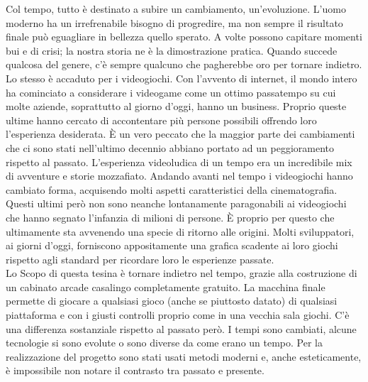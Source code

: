 
\begin{thesisabstract}[english]
Col tempo, tutto è destinato a subire un cambiamento, un’evoluzione. L’uomo moderno ha un irrefrenabile bisogno di progredire, ma non sempre il risultato finale può eguagliare in bellezza quello sperato. A volte possono capitare momenti bui e di crisi; la nostra storia ne è la dimostrazione pratica. Quando succede qualcosa del genere, c’è sempre qualcuno che pagherebbe oro per tornare indietro. Lo stesso è accaduto per i videogiochi. Con l'avvento di internet, il mondo intero ha cominciato a considerare i videogame come un ottimo passatempo su cui molte aziende, soprattutto al giorno d’oggi, hanno un business. Proprio queste ultime hanno cercato di accontentare più persone possibili offrendo loro l’esperienza desiderata. È un vero peccato che la maggior parte dei cambiamenti che ci sono stati nell’ultimo decennio abbiano portato ad un peggioramento rispetto al passato. L’esperienza videoludica di un tempo era un incredibile mix di avventure e storie mozzafiato. Andando avanti nel tempo i videogiochi hanno cambiato forma, acquisendo molti aspetti caratteristici della cinematografia. Questi ultimi però non sono neanche lontanamente paragonabili ai videogiochi che hanno segnato l’infanzia di milioni di persone. È proprio per questo che ultimamente sta avvenendo una specie di ritorno alle origini. Molti sviluppatori, ai giorni d’oggi, forniscono appositamente una grafica scadente ai loro giochi rispetto agli standard per ricordare loro le esperienze passate.\\Lo Scopo di questa tesina è tornare indietro nel tempo, grazie alla costruzione di un cabinato arcade casalingo completamente gratuito. La macchina finale permette di giocare a qualsiasi gioco (anche se piuttosto datato) di qualsiasi piattaforma e con i giusti controlli proprio come in una vecchia sala giochi. C’è una differenza sostanziale rispetto al passato però. I tempi sono cambiati, alcune tecnologie si sono evolute o sono diverse da come erano un tempo. Per la realizzazione del progetto sono stati usati metodi moderni e, anche esteticamente, è impossibile non notare il contrasto tra passato e presente.
\end{thesisabstract}


